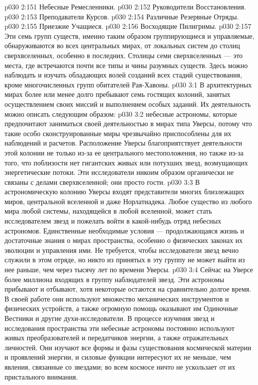 \vs p030 2:151 \bibnobreakspace Небесные Ремесленники.
\vs p030 2:152 \bibnobreakspace Руководители Восстановления.
\vs p030 2:153 \bibnobreakspace Преподаватели Курсов.
\vs p030 2:154 \bibnobreakspace Различные Резервные Отряды.
\vs p030 2:155 \bibnobreakspace Приезжие Учащиеся.
\vs p030 2:156 \bibnobreakspace Восходящие Пилигримы.
\vs p030 2:157 \pc Эти семь групп существ, именно таким образом группирующиеся и управляемые, обнаруживаются во всех центральных мирах, от локальных систем до столиц сверхвселенных, особенно в последних. Столицы семи сверхвселенных --- это места, где встречаются почти все типы и чины разумных существ. Здесь можно наблюдать и изучать обладающих волей созданий всех стадий существования, кроме многочисленных групп обитателей Рая\hyp{}Хавоны.
\vs p030 3:1 В архитектурных мирах более или менее долго пребывают семь гостящих колоний, занятых осуществлением своих миссий и выполнением особых заданий. Их деятельность можно описать следующим образом:
\vs p030 3:2 \pc {}\bibnobreakspace {} небесные астрономы, которые предпочитают заниматься своей деятельностью в мирах типа Уверсы, потому что такие особо сконструированные миры чрезвычайно приспособлены для их наблюдений и расчетов. Расположение Уверсы благоприятствует деятельности этой колонии не только из\hyp{}за ее центрального местоположения, но также из\hyp{}за того, что поблизости нет гигантских живых или потухших звезд, возмущающих энергетические потоки. Эти исследователи никоим образом органически не связаны с делами сверхвселенной; они просто гости.
\vs p030 3:3 В астрономическую колонию Уверсы входят представители многих близлежащих миров, центральной вселенной и даже Норлатиадека. Любое существо из любого мира любой системы, находящейся в любой вселенной, может стать исследователем звезд и пожелать войти в какой\hyp{}нибудь отряд небесных астрономов. Единственные необходимые условия --- продолжающаяся жизнь и достаточные знания о мирах пространства, особенно о физических законах их эволюции и управления ими. Не требуется, чтобы исследователи звезд вечно служили в этом отряде, но никто из принятых в эту группу не может выйти из нее раньше, чем через тысячу лет по времени Уверсы.
\vs p030 3:4 Сейчас на Уверсе более миллиона входящих в группу наблюдателей звезд. Эти астрономы прибывают и отбывают, хотя некоторые остаются на сравнительно долгое время. В своей работе они используют множество механических инструментов и физических устройств, а также огромную помощь оказывают им Одиночные Вестники и другие духи\hyp{}исследователи. В процессе изучения звезд и исследования пространства эти небесные астрономы постоянно используют живых преобразователей и передатчиков энергии, а также отражательных личностей. Они изучают все формы и фазы существования космической материи и проявлений энергии, и силовые функции интересуют их не меньше, чем явления, связанные со звездами; во всем космосе ничто не ускользает от их пристального внимания.
